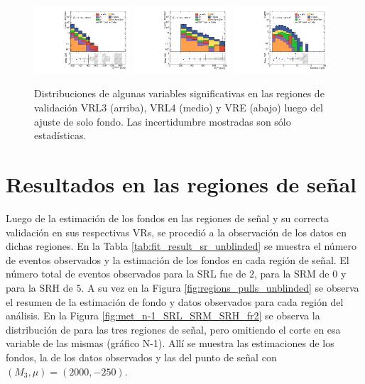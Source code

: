 \begin{figure}[ht!]
\begin{center}
    \includegraphics[width=0.32\textwidth]{images/results/fr2_unblind/can_VRE_ph_pt0_afterFit.pdf}
    \includegraphics[width=0.32\textwidth]{images/results/fr2_unblind/can_VRE_met_et_afterFit.pdf}
    \includegraphics[width=0.32\textwidth]{images/results/fr2_unblind/can_VRE_jet_n_afterFit.pdf}

    
    \caption{Distribuciones de algunas variables significativas en las regiones de validación VRL3 (arriba), VRL4 (medio) y VRE (abajo) luego del ajuste de solo fondo. Las incertidumbre mostradas son sólo estadísticas.}
    \label{fig:dist_vrle_bkgonly}
  \end{center}
\end{figure}






\section{Resultados en las regiones de señal}

Luego de la estimación de los fondos en las regiones de señal y su correcta validación en sus respectivas VRs, se procedió a la observación de los datos en dichas regiones. En la Tabla \ref{tab:fit_result_sr_unblinded} se muestra el número de eventos observados y la estimación de los fondos en cada región de señal. El número total de eventos observados para la SRL fue de $2$, para la SRM de $0$ y para la SRH de $5$. A su vez en la Figura \ref{fig:regions_pulls_unblinded} se observa el resumen de la estimación de fondo y datos observados para cada región del análisis. En la Figura \ref{fig:met_n-1_SRL_SRM_SRH_fr2} se observa la distribución de \met para las tres regiones de señal, pero omitiendo el corte en esa variable de las mismas (gráfico N-1). Allí se muestra las estimaciones de los fondos, la de los datos observados y las del punto de señal con $(M_3, \mu) = (2000, -250)$.


